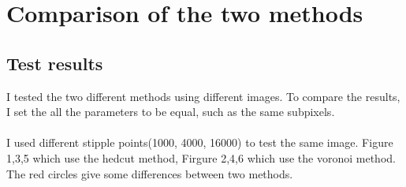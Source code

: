 \documentclass[11pt]{article}
\begin{document}
\section{Comparison of the two methods}

\subsection{Test results}
I tested the two different methods using different images. To compare the results, I set the all the parameters to be equal, such as the same subpixels. 
\\\\I used different stipple points(1000, 4000, 16000) to test the same image. Figure 1,3,5 which use the hedcut method, Firgure 2,4,6 which use the voronoi method. The red circles give some differences between two methods.
\end{document}
